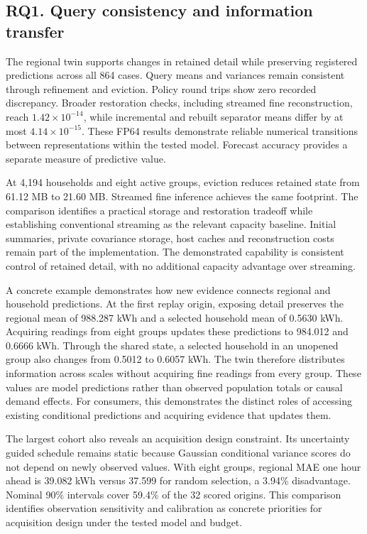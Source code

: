 \documentclass[conference]{IEEEtran}
\begin{document}
\subsection{RQ1. Query consistency and information transfer}
The regional twin supports changes in retained detail while preserving registered predictions across all 864 cases. Query means and variances remain consistent through refinement and eviction. Policy round trips show zero recorded discrepancy. Broader restoration checks, including streamed fine reconstruction, reach $1.42\times10^{-14}$, while incremental and rebuilt separator means differ by at most $4.14\times10^{-15}$. These FP64 results demonstrate reliable numerical transitions between representations within the tested model. Forecast accuracy provides a separate measure of predictive value.

At 4,194 households and eight active groups, eviction reduces retained state from 61.12 MB to 21.60 MB. Streamed fine inference achieves the same footprint. The comparison identifies a practical storage and restoration tradeoff while establishing conventional streaming as the relevant capacity baseline. Initial summaries, private covariance storage, host caches and reconstruction costs remain part of the implementation. The demonstrated capability is consistent control of retained detail, with no additional capacity advantage over streaming.

A concrete example demonstrates how new evidence connects regional and household predictions. At the first replay origin, exposing detail preserves the regional mean of 988.287 kWh and a selected household mean of 0.5630 kWh. Acquiring readings from eight groups updates these predictions to 984.012 and 0.6666 kWh. Through the shared state, a selected household in an unopened group also changes from 0.5012 to 0.6057 kWh. The twin therefore distributes information across scales without acquiring fine readings from every group. These values are model predictions rather than observed population totals or causal demand effects. For consumers, this demonstrates the distinct roles of accessing existing conditional predictions and acquiring evidence that updates them.

The largest cohort also reveals an acquisition design constraint. Its uncertainty guided schedule remains static because Gaussian conditional variance scores do not depend on newly observed values. With eight groups, regional MAE one hour ahead is 39.082 kWh versus 37.599 for random selection, a 3.94\% disadvantage. Nominal 90\% intervals cover 59.4\% of the 32 scored origins. This comparison identifies observation sensitivity and calibration as concrete priorities for acquisition design under the tested model and budget.
\end{document}
